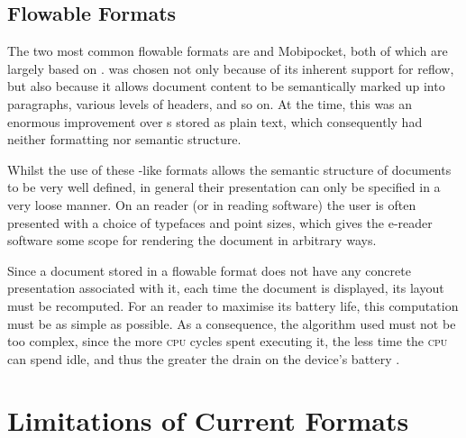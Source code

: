 

\subsection{Flowable Formats}
\label{sec:flowableformats}

The two most common flowable \ebook{} formats are \epub{} and Mobipocket, both of which are largely based on \html{} \cite{IDPF2011}. \html{} was chosen not only because of its inherent support for reflow, but also because it allows document content to be semantically marked up into paragraphs, various levels of headers, and so on. At the time, this was an enormous improvement over \ebook{}s stored as plain text, which consequently had neither formatting nor semantic structure. 

Whilst the use of these \html{}-like formats allows the semantic structure of documents to be very well defined, in general their presentation can only be specified in a very loose manner. On an \ebook{} reader (or in \ebook{} reading software) the user is often presented with a choice of typefaces and point sizes, which gives the e-reader software some scope for rendering the document in arbitrary ways.

Since a document stored in a flowable format does not have any concrete presentation associated with it, each time the document is displayed, its layout must be recomputed. For an \ebook{} reader to maximise its battery life, this computation must be as simple as possible. As a consequence, the algorithm used must not be too complex, since the more \textsc{cpu} cycles spent executing it, the less time the \textsc{cpu} can spend idle, and thus the greater the drain on the device's battery \cite{Pinkney2011}.


\section{Limitations of Current Formats}

